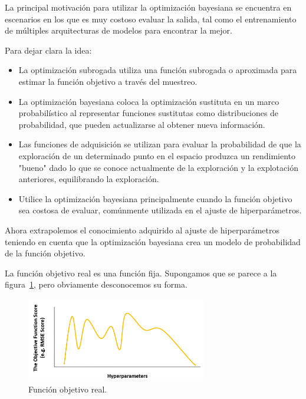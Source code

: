 \documentclass[a4paper,12pt]{article}
\begin{document}
La principal motivación para utilizar la optimización bayesiana se encuentra en escenarios en los que es muy costoso evaluar la salida, tal como el entrenamiento de múltiples arquitecturas de modelos para encontrar la mejor.

Para dejar clara la idea:

\begin{itemize}[noitemsep, topsep=2pt]
	\item La optimización subrogada utiliza una función subrogada o aproximada para estimar la función objetivo a través del muestreo.
	\item La optimización bayesiana coloca la optimización sustituta en un marco probabilístico al representar funciones sustitutas como distribuciones de probabilidad, que pueden actualizarse al obtener nueva información.
	\item Las funciones de adquisición se utilizan para evaluar la probabilidad de que la exploración de un determinado punto en el espacio produzca un rendimiento "bueno" dado lo que se conoce actualmente de la exploración y la explotación anteriores, equilibrando la exploración.
	\item Utilice la optimización bayesiana principalmente cuando la función objetivo sea costosa de evaluar, comúnmente utilizada en el ajuste de hiperparámetros.
\end{itemize}

Ahora extrapolemos el conocimiento adquirido al ajuste de hiperparámetros teniendo en cuenta que la optimización bayesiana crea un modelo de probabilidad de la función objetivo. \citep{Wang2020Apr}

La función objetivo real es una función fija. Supongamos que se parece a la figura~\ref{fig:bayes6}, pero obviamente desconocemos su forma.

\begin{figure}[H]
	\begin{center}
	\includegraphics[width=0.7\textwidth]{bayes_opt_6.png}
  	\caption{Función objetivo real.}
  	\label{fig:bayes6}
  	\end{center}
\end{figure}
\end{document}
